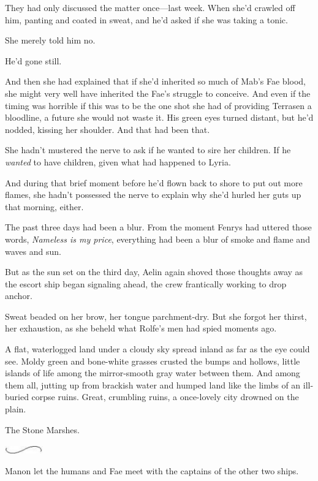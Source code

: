 They had only discussed the matter once---last week. When she'd crawled off him, panting and coated in sweat, and he'd asked if she was taking a tonic.

She merely told him no.

He'd gone still.

And then she had explained that if she'd inherited so much of Mab's Fae blood, she might very well have inherited the Fae's struggle to conceive. And even if the timing was horrible  if this was to be the one shot she had of providing Terrasen a bloodline, a future
 she would not waste it. His green eyes turned distant, but he'd nodded, kissing her shoulder. And that had been that.

She hadn't mustered the nerve to ask if he wanted to sire her children. If he \emph{wanted} to have children, given what had happened to Lyria.

And during that brief moment before he'd flown back to shore to put out more flames, she hadn't possessed the nerve to explain why she'd hurled her guts up that morning, either.

The past three days had been a blur. From the moment Fenrys had uttered those words, \emph{Nameless is my price}, everything had been a blur of smoke and flame and waves and sun.

But as the sun set on the third day, Aelin again shoved those thoughts away as the escort ship began signaling ahead, the crew frantically working to drop anchor.

Sweat beaded on her brow, her tongue parchment-dry. But she forgot her thirst, her exhaustion, as she beheld what Rolfe's men had spied moments ago.

A flat, waterlogged land under a cloudy sky spread inland as far as the eye could see. Moldy green and bone-white grasses crusted the bumps and hollows, little islands of life among the mirror-smooth gray water between them. And among them all, jutting up from brackish water and humped land like the limbs of an ill-buried corpse  ruins. Great, crumbling ruins, a once-lovely city drowned on the plain.

The Stone Marshes.

\includegraphics[width=0.65in,height=0.13in]{images/seperator}

Manon let the humans and Fae meet with the captains of the other two ships.

